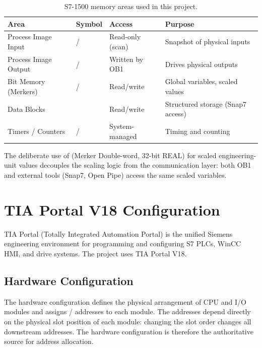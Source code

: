 \begin{table}[H]
  \centering
  \caption{S7-1500 memory areas used in this project.}
  \label{tab:plcmem}
  \begin{tabular}{@{}L{2.8cm}L{2.0cm}L{3cm}L{5.2cm}@{}}
    \toprule
    \textbf{Area} & \textbf{Symbol} & \textbf{Access} & \textbf{Purpose} \\
    \midrule
    Process Image Input  & / & Read-only (scan) & Snapshot of physical inputs \\
    Process Image Output & / & Written by OB1   & Drives physical outputs \\
    Bit Memory (Merkers) & / & Read/write       & Global variables, scaled values \\
    Data Blocks          &              & Read/write       & Structured storage (Snap7 access) \\
    Timers / Counters    & /  & System-managed   & Timing and counting \\
    \bottomrule
  \end{tabular}
\end{table}

The deliberate use of  (Merker Double-word, 32-bit REAL) for scaled
engineering-unit values decouples the scaling logic from the communication layer:
both OB1 and external tools (Snap7, Open Pipe) access the same scaled variables.

\section{TIA Portal V18 Configuration}

TIA Portal (Totally Integrated Automation Portal) is the unified Siemens engineering
environment for programming and configuring S7 PLCs, WinCC HMI, and drive systems.
The project uses TIA Portal V18.

\subsection{Hardware Configuration}

The hardware configuration defines the physical arrangement of CPU and I/O modules and
assigns / addresses to each module. The addresses depend directly
on the physical slot position of each module: changing the slot order changes all downstream
addresses. The hardware configuration is therefore the authoritative source for address
allocation.

